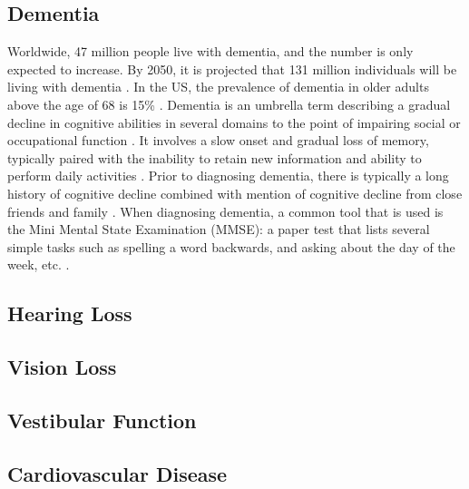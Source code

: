 \subsection{Dementia}
Worldwide, 47 million people live with dementia, and the number is only expected to increase. By 2050, it is projected that 131 million individuals will be living with dementia \cite{noauthor_diagnosis_nodate}. In the US, the prevalence of dementia in older adults above the age of 68 is 15\% \cite{noauthor_diagnosis_nodate}. Dementia is an umbrella term describing a gradual decline in cognitive abilities in several domains to the point of impairing social or occupational function \cite{noauthor_diagnosis_nodate}. It involves a slow onset and gradual loss of memory, typically paired with the inability to retain new information and ability to perform daily activities \cite{noauthor_diagnosis_nodate}. Prior to diagnosing dementia, there is typically a long history of cognitive decline combined with mention of cognitive decline from close friends and family \cite{noauthor_diagnosis_nodate}. When diagnosing dementia, a common tool that is used is the Mini Mental State Examination (MMSE): a paper test that lists several simple tasks such as spelling a word backwards, and asking about the day of the week, etc. \cite{arevalo-rodriguez_mini-mental_2015}. 

\subsection{Hearing Loss}

\subsection{Vision Loss}

\subsection{Vestibular Function}

\subsection{Cardiovascular Disease}

